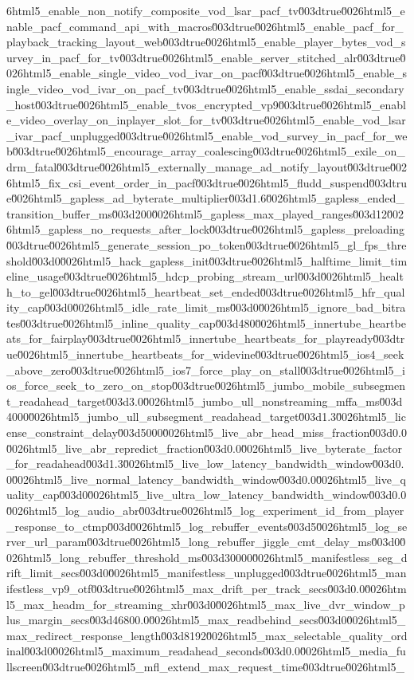 {6html5_enable_non_notify_composite_vod_lsar_pacf_tv\u003dtrue\u0026html5_enable_pacf_command_api_with_macros\u003dtrue\u0026html5_enable_pacf_for_playback_tracking_layout_web\u003dtrue\u0026html5_enable_player_bytes_vod_survey_in_pacf_for_tv\u003dtrue\u0026html5_enable_server_stitched_alr\u003dtrue\u0026html5_enable_single_video_vod_ivar_on_pacf\u003dtrue\u0026html5_enable_single_video_vod_ivar_on_pacf_tv\u003dtrue\u0026html5_enable_ssdai_secondary_host\u003dtrue\u0026html5_enable_tvos_encrypted_vp9\u003dtrue\u0026html5_enable_video_overlay_on_inplayer_slot_for_tv\u003dtrue\u0026html5_enable_vod_lsar_ivar_pacf_unplugged\u003dtrue\u0026html5_enable_vod_survey_in_pacf_for_web\u003dtrue\u0026html5_encourage_array_coalescing\u003dtrue\u0026html5_exile_on_drm_fatal\u003dtrue\u0026html5_externally_manage_ad_notify_layout\u003dtrue\u0026html5_fix_csi_event_order_in_pacf\u003dtrue\u0026html5_fludd_suspend\u003dtrue\u0026html5_gapless_ad_byterate_multiplier\u003d1.6\u0026html5_gapless_ended_transition_buffer_ms\u003d200\u0026html5_gapless_max_played_ranges\u003d12\u0026html5_gapless_no_requests_after_lock\u003dtrue\u0026html5_gapless_preloading\u003dtrue\u0026html5_generate_session_po_token\u003dtrue\u0026html5_gl_fps_threshold\u003d0\u0026html5_hack_gapless_init\u003dtrue\u0026html5_halftime_limit_timeline_usage\u003dtrue\u0026html5_hdcp_probing_stream_url\u003d\u0026html5_health_to_gel\u003dtrue\u0026html5_heartbeat_set_ended\u003dtrue\u0026html5_hfr_quality_cap\u003d0\u0026html5_idle_rate_limit_ms\u003d0\u0026html5_ignore_bad_bitrates\u003dtrue\u0026html5_inline_quality_cap\u003d480\u0026html5_innertube_heartbeats_for_fairplay\u003dtrue\u0026html5_innertube_heartbeats_for_playready\u003dtrue\u0026html5_innertube_heartbeats_for_widevine\u003dtrue\u0026html5_ios4_seek_above_zero\u003dtrue\u0026html5_ios7_force_play_on_stall\u003dtrue\u0026html5_ios_force_seek_to_zero_on_stop\u003dtrue\u0026html5_jumbo_mobile_subsegment_readahead_target\u003d3.0\u0026html5_jumbo_ull_nonstreaming_mffa_ms\u003d4000\u0026html5_jumbo_ull_subsegment_readahead_target\u003d1.3\u0026html5_license_constraint_delay\u003d5000\u0026html5_live_abr_head_miss_fraction\u003d0.0\u0026html5_live_abr_repredict_fraction\u003d0.0\u0026html5_live_byterate_factor_for_readahead\u003d1.3\u0026html5_live_low_latency_bandwidth_window\u003d0.0\u0026html5_live_normal_latency_bandwidth_window\u003d0.0\u0026html5_live_quality_cap\u003d0\u0026html5_live_ultra_low_latency_bandwidth_window\u003d0.0\u0026html5_log_audio_abr\u003dtrue\u0026html5_log_experiment_id_from_player_response_to_ctmp\u003d\u0026html5_log_rebuffer_events\u003d5\u0026html5_log_server_url_param\u003dtrue\u0026html5_long_rebuffer_jiggle_cmt_delay_ms\u003d0\u0026html5_long_rebuffer_threshold_ms\u003d30000\u0026html5_manifestless_seg_drift_limit_secs\u003d0\u0026html5_manifestless_unplugged\u003dtrue\u0026html5_manifestless_vp9_otf\u003dtrue\u0026html5_max_drift_per_track_secs\u003d0.0\u0026html5_max_headm_for_streaming_xhr\u003d0\u0026html5_max_live_dvr_window_plus_margin_secs\u003d46800.0\u0026html5_max_readbehind_secs\u003d0\u0026html5_max_redirect_response_length\u003d8192\u0026html5_max_selectable_quality_ordinal\u003d0\u0026html5_maximum_readahead_seconds\u003d0.0\u0026html5_media_fullscreen\u003dtrue\u0026html5_mfl_extend_max_request_time\u003dtrue\u0026html5_}
